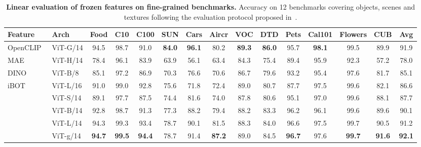 \begin{table}[t]
  \centering
  \setlength{\tabcolsep}{4pt}
  \begin{tabu}{@{}l@{}l cccccccccccc c @{}}
    \toprule
    Feature & Arch & \scriptsize Food & \scriptsize C10 & \scriptsize C100 & \scriptsize SUN & \scriptsize Cars & \scriptsize Aircr & \scriptsize VOC & \scriptsize DTD & \scriptsize Pets & \scriptsize Cal101 & \scriptsize Flowers & \scriptsize CUB & Avg\\
    \midrule
    OpenCLIP~ & ViT-G/14 & 94.5 & 98.7 & 91.0 & \bf 84.0 & \bf 96.1 & 80.2 & \bf 89.3 & \bf 86.0 & 95.7 & \bf 98.1 & 99.5 & 89.9 & 91.9\\
    \midrule
    MAE   & ViT-H/14    & 78.4 & 96.1 & 83.9 & 63.9 & 56.1 & 63.4 & 84.3 & 75.4 & 89.4 & 95.9 & 92.3 & 57.2 &  78.0\\
    DINO  & ViT-B/8     & 85.1 & 97.2 & 86.9 & 70.3 & 76.6 & 70.6 & 86.7 & 79.6 & 93.2 & 95.4 & 97.6 & 81.7 &  85.1\\
    iBOT  & ViT-L/16    & 91.0 & 99.0 & 92.8 & 75.6 & 71.8 & 72.4 & 89.0 & 80.7 & 87.7 & 97.5 & 99.6 & 82.1 &  86.6\\
    \midrule
      & ViT-S/14    & 89.1 & 97.7 & 87.5 & 74.4 & 81.6 & 74.0 & 87.8 & 80.6 & 95.1 & 97.0 & 99.6 & 88.1 & 87.7 \\ 
                            & ViT-B/14    & 92.8 & 98.7 & 91.3 & 77.3 & 88.2 & 79.4 & 88.2 & 83.3 & 96.2 & 96.1 & 99.6 & 89.6 & 90.1 \\ 
                            & ViT-L/14    & 94.3 & 99.3 & 93.4 & 78.7 & 90.1 & 81.5 & 88.3 & 84.0 & 96.6 & 97.5 & 99.7 & 90.5 & 91.2\\ 
                            & ViT-g/14    & \bf 94.7 & \bf 99.5 & \bf 94.4 & 78.7 & 91.4 & \bf 87.2 & 89.0 & 84.5 & \bf 96.7 & 97.6 & \bf 99.7 & \bf 91.6 & \bf 92.1 \\
    \bottomrule
  \end{tabu}
  \caption{
    \textbf{Linear evaluation of frozen features on fine-grained benchmarks.} 
    Accuracy on 12 benchmarks covering objects, scenes and textures following the evaluation protocol proposed in~\citet{chen2020simple}.
  }
  \label{tab:finegrained}
\end{table}



